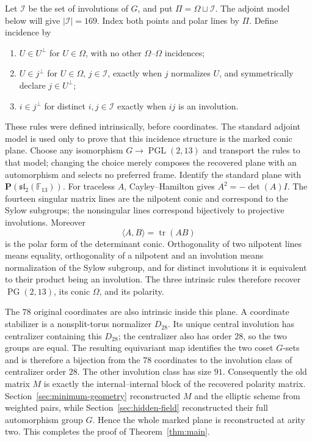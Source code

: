 \documentclass[11pt]{article}
\theoremstyle{definition}
\theoremstyle{remark}
\newcommand{\F}{\mathbb F}
\newcommand{\PG}{\operatorname{PG}}
\newcommand{\PGL}{\operatorname{PGL}}
\begin{document}
Let \(\mathcal I\) be the set of involutions of \(G\), and put
\(\Pi=\Omega\sqcup\mathcal I\).  The adjoint model below will give
\(|\mathcal I|=169\).  Index both points and polar lines by \(\Pi\).  Define
incidence by
\begin{enumerate}[label=(\roman*)]
\item \(U\in U^\perp\) for \(U\in\Omega\), with no other
  \(\Omega\)--\(\Omega\) incidences;
\item \(U\in j^\perp\) for \(U\in\Omega\), \(j\in\mathcal I\), exactly
  when \(j\) normalizes \(U\), and symmetrically declare \(j\in U^\perp\);
\item \(i\in j^\perp\) for distinct \(i,j\in\mathcal I\) exactly when
  \(ij\) is an involution.
\end{enumerate}

These rules were defined intrinsically, before coordinates.  The standard
adjoint model is used only to prove that this incidence structure is the
marked conic plane.  Choose any isomorphism \(G\to\PGL(2,13)\) and transport
the rules to that model; changing the choice merely composes the recovered
plane with an automorphism and selects no preferred frame.  Identify the
standard plane with \(\mathbf P(\mathfrak{sl}_2(\F_{13}))\).  For traceless
\(A\), Cayley--Hamilton gives \(A^2=-\det(A)I\).  The fourteen singular
matrix lines are the nilpotent conic and correspond to the Sylow subgroups;
the nonsingular lines correspond bijectively to projective involutions.
Moreover
\[
 \langle A,B\rangle=\operatorname{tr}(AB)
\]
is the polar form of the determinant conic.  Orthogonality of two nilpotent
lines means equality, orthogonality of a nilpotent and an involution means
normalization of the Sylow subgroup, and for distinct involutions it is
equivalent to their product being an involution.  The three intrinsic rules
therefore recover \(\PG(2,13)\), its conic \(\Omega\), and its polarity.

The \(78\) original coordinates are also intrinsic inside this plane.  A
coordinate stabilizer is a nonsplit-torus normalizer \(D_{28}\).  Its unique
central involution has centralizer containing this \(D_{28}\); the
centralizer also has order \(28\), so the two groups are equal.  The resulting
equivariant map identifies the two coset \(G\)-sets and is therefore a
bijection from the 78 coordinates to the involution class of centralizer
order \(28\).  The other involution class
has size \(91\).
Consequently the old matrix \(M\) is exactly the internal--internal block of
the recovered polarity matrix.  Section~\ref{sec:minimum-geometry}
reconstructed \(M\) and the elliptic scheme from weighted pairs, while
Section~\ref{sec:hidden-field} reconstructed their full automorphism group
\(G\).  Hence the whole marked plane is reconstructed at arity two.  This
completes the proof of Theorem~\ref{thm:main}.
\end{document}

